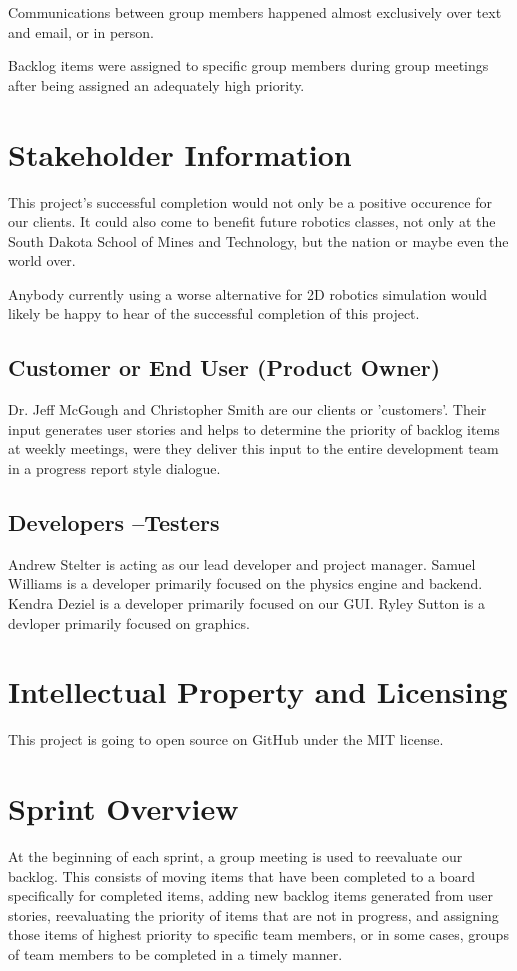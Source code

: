 Communications between group members happened almost exclusively over text and email, or in person.

Backlog items were assigned to specific group members during group meetings after being assigned an adequately high priority.


\section{ Stakeholder Information}
This project's successful completion would not only be a positive occurence for our clients. It could also come to benefit future robotics classes, not only at the South Dakota School of Mines and Technology, but the nation or maybe even the world over.

Anybody currently using a worse alternative for 2D robotics simulation would likely be happy to hear of the successful completion of this project.

\subsection{Customer or End User (Product Owner)}
Dr. Jeff McGough and Christopher Smith are our clients or 'customers'. Their input generates user stories and helps to determine the priority of backlog items at weekly meetings, were they deliver this input to the entire development team in a progress report style dialogue.

\subsection{Developers --Testers}
Andrew Stelter is acting as our lead developer and project manager. Samuel Williams is a developer primarily focused on the physics engine and backend. Kendra Deziel is a developer primarily focused on our GUI. Ryley Sutton is a devloper primarily focused on graphics.

\section{Intellectual Property and Licensing}
This project is going to open source on GitHub under the MIT license. 

\section{Sprint  Overview}
At the beginning of each sprint, a group meeting is used to reevaluate our backlog. This consists of moving items that have been completed to a board specifically for completed items, adding new backlog items generated from user stories, reevaluating the priority of items that are not in progress, and assigning those items of highest priority to specific team members, or in some cases, groups of team members to be completed in a timely manner.

